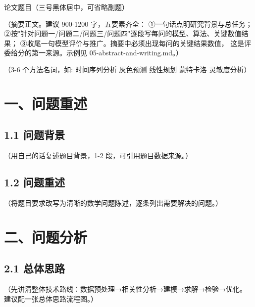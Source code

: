 \documentclass[12pt,a4paper,fontset=windows]{ctexart}
\begin{document}
\thispagestyle{plain}
\begin{center}
  {\heiti{} 论文题目（三号黑体居中，可省略副题）}
\end{center}
\vspace{0.6em}

\vspace{0.3em}

（摘要正文。建议 900-1200 字，五要素齐全：
①一句话点明研究背景与总任务；
②按"针对问题一/问题二/问题三/问题四"逐段写每问的模型、算法、关键数值结果；
③收尾一句模型评价与推广。摘要中必须出现每问的关键结果数值，
这是评委给分的第一来源。示例见 05-abstract-and-writing.md。）

\vspace{0.6em}
（3-6 个方法名词，如: 时间序列分析 灰色预测 线性规划 蒙特卡洛 灵敏度分析）

\newpage


\section*{一、问题重述}

\subsection*{1.1 问题背景}
（用自己的话复述题目背景，1-2 段，可引用题目数据来源。）

\subsection*{1.2 问题重述}
（将题目要求改写为清晰的数学问题陈述，逐条列出需要解决的问题。）

\section*{二、问题分析}

\subsection*{2.1 总体思路}
（先讲清整体技术路线：数据预处理→相关性分析→建模→求解→检验→优化。
建议配一张总体思路流程图。）
\end{document}
